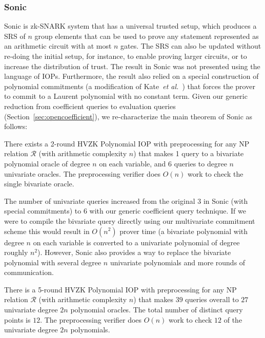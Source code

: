 \subsubsection{Sonic} 
\textsf{Sonic} is zk-SNARK system that has a universal trusted setup, which produces a SRS of $n$ group elements that can be used to prove any statement represented as an arithmetic circuit with at most $n$ gates. The SRS can also be updated without re-doing the initial setup, for instance, to enable proving larger circuits, or to increase the distribution of trust. The result in \textsf{Sonic} was not presented using the language of IOPs. Furthermore, the result also relied on a special construction of polynomial commitments (a modification of Kate~\emph{et al.}~\cite{AC:KatZavGol10}) that forces the prover to commit to a Laurent polynomial with no constant term. Given our generic reduction from coefficient queries to evaluation queries (Section~\ref{sec:opencoefficient}), we re-characterize the main theorem of \textsf{Sonic} as follows: 

\begin{theorem}
There exists a 2-round HVZK Polynomial IOP with preprocessing for any NP relation $\mathcal{R}$ (with arithmetic complexity $n$) that makes 1 query to a bivariate polynomial oracle of degree $n$ on each variable, and 6 queries to degree $n$ univariate oracles. The preprocessing verifier does $O(n)$ work to check the single bivariate oracle. 
\end{theorem}

The number of univariate queries increased from the original $3$ in \textsf{Sonic} (with special commitments) to $6$ with our generic coefficient query technique. 
If we were to compile the bivariate query directly using our multivariate commitment scheme this would result in $O(n^2)$ prover time (a bivariate polynomial with degree $n$ on each variable is converted to a univariate polynomial of degree roughly $n^2$). However, \textsf{Sonic} also provides a way to replace the bivariate polynomial with several degree $n$ univariate polynomials and more rounds of communication. 

\begin{theorem}\label{thm:sonic} 
There is a 5-round HVZK Polynomial IOP with preprocessing for any NP relation $\mathcal{R}$ (with arithmetic complexity $n$) that makes $39$ queries overall to $27$ univariate degree $2n$ polynomial oracles. The total number of distinct query points is $12$. The preprocessing verifier does $O(n)$ work to check $12$ of the univariate degree $2n$ polynomials. 
\end{theorem}

